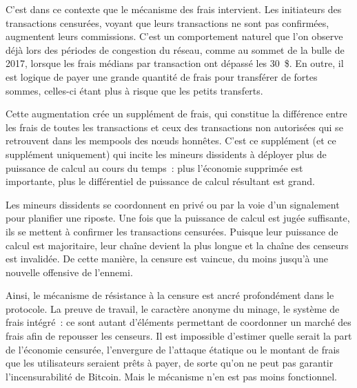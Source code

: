 C'est dans ce contexte que le mécanisme des frais intervient. Les initiateurs des transactions censurées, voyant que leurs transactions ne sont pas confirmées, augmentent leurs commissions. C'est un comportement naturel que l'on observe déjà lors des périodes de congestion du réseau, comme au sommet de la bulle de 2017, lorsque les frais médians par transaction ont dépassé les 30~\$. En outre, il est logique de payer une grande quantité de frais pour transférer de fortes sommes, celles-ci étant plus à risque que les petits transferts.

Cette augmentation crée un supplément de frais, qui constitue la différence entre les frais de toutes les transactions et ceux des transactions non autorisées qui se retrouvent dans les mempools des nœuds honnêtes. C'est ce supplément (et ce supplément uniquement) qui incite les mineurs dissidents à déployer plus de puissance de calcul au cours du temps~: plus l'économie supprimée est importante, plus le différentiel de puissance de calcul résultant est grand.

Les mineurs dissidents se coordonnent en privé ou par la voie d'un signalement pour planifier une riposte. Une fois que la puissance de calcul est jugée suffisante, ils se mettent à confirmer les transactions censurées. Puisque leur puissance de calcul est majoritaire, leur chaîne devient la plus longue et la chaîne des censeurs est invalidée. De cette manière, la censure est vaincue, du moins jusqu'à une nouvelle offensive de l'ennemi.

Ainsi, le mécanisme de résistance à la censure est ancré profondément dans le protocole. La preuve de travail, le caractère anonyme du minage, le système de frais intégré~: ce sont autant d'éléments permettant de coordonner un marché des frais afin de repousser les censeurs. Il est impossible d'estimer quelle serait la part de l'économie censurée, l'envergure de l'attaque étatique ou le montant de frais que les utilisateurs seraient prêts à payer, de sorte qu'on ne peut pas garantir l'incensurabilité de Bitcoin. Mais le mécanisme n'en est pas moins fonctionnel.

